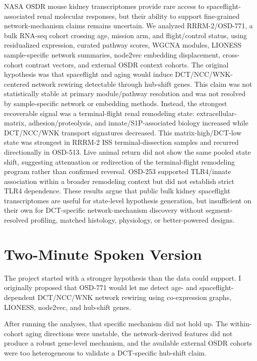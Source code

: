 \documentclass[11pt]{article}
\newcommand{\RRRM}{RRRM-2}
\begin{document}
NASA OSDR mouse kidney transcriptomes provide rare access to spaceflight-associated renal molecular responses, but their ability to support fine-grained network-mechanism claims remains uncertain. We analyzed \RRRM{}/OSD-771, a bulk RNA-seq cohort crossing age, mission arm, and flight/control status, using residualized expression, curated pathway scores, WGCNA modules, LIONESS sample-specific network summaries, node2vec embedding displacement, cross-cohort contrast vectors, and external OSDR context cohorts. The original hypothesis was that spaceflight and aging would induce DCT/NCC/WNK-centered network rewiring detectable through hub-shift genes. This claim was not statistically stable at primary module/pathway resolution and was not resolved by sample-specific network or embedding methods. Instead, the strongest recoverable signal was a terminal-flight renal remodeling state: extracellular-matrix, adhesion/proteolysis, and innate/S1P-associated biology increased while DCT/NCC/WNK transport signatures decreased. This matrix-high/DCT-low state was strongest in \RRRM{} ISS terminal-dissection samples and recurred directionally in OSD-513. Live animal return did not show the same pooled state shift, suggesting attenuation or redirection of the terminal-flight remodeling program rather than confirmed reversal. OSD-253 supported TLR4/innate association within a broader remodeling context but did not establish strict TLR4 dependence. These results argue that public bulk kidney spaceflight transcriptomes are useful for state-level hypothesis generation, but insufficient on their own for DCT-specific network-mechanism discovery without segment-resolved profiling, matched histology, physiology, or better-powered designs.

\section*{Two-Minute Spoken Version}

The project started with a stronger hypothesis than the data could support. I originally proposed that OSD-771 would let me detect age- and spaceflight-dependent DCT/NCC/WNK network rewiring using co-expression graphs, LIONESS, node2vec, and hub-shift genes.

After running the analyses, that specific mechanism did not hold up. The within-cohort aging directions were unstable, the network-derived features did not produce a robust gene-level mechanism, and the available external OSDR cohorts were too heterogeneous to validate a DCT-specific hub-shift claim.
\end{document}
